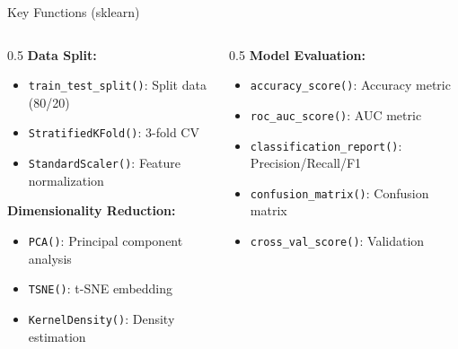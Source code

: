 \documentclass[aspectratio=169]{beamer}
\begin{document}
\begin{frame}{Key Functions (sklearn)}
\begin{columns}
\begin{column}{0.5\textwidth}
\textbf{Data Split:}
\begin{itemize}
    \item \texttt{train\_test\_split()}: Split data (80/20)
    \item \texttt{StratifiedKFold()}: 3-fold CV
    \item \texttt{StandardScaler()}: Feature normalization
\end{itemize}
\bigskip
\textbf{Dimensionality Reduction:}
\begin{itemize}
    \item \texttt{PCA()}: Principal component analysis
    \item \texttt{TSNE()}: t-SNE embedding
    \item \texttt{KernelDensity()}: Density estimation
\end{itemize}
\end{column}
\begin{column}{0.5\textwidth}
\textbf{Model Evaluation:}
\begin{itemize}
    \item \texttt{accuracy\_score()}: Accuracy metric
    \item \texttt{roc\_auc\_score()}: AUC metric
    \item \texttt{classification\_report()}: Precision/Recall/F1
    \item \texttt{confusion\_matrix()}: Confusion matrix
    \item \texttt{cross\_val\_score()}: Validation
\end{itemize}
\end{column}
\end{columns}
\end{frame}
\end{document}
